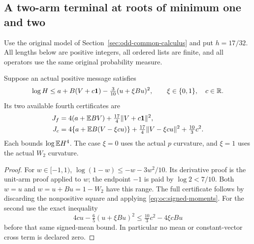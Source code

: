 \subsection{A two-arm terminal at roots of minimum one and two}
\label{sec:odd-two:roots}

Use the original model of Section~\ref{sec:odd-common-calculus} and put
\(h=17/32\). All lengths below are positive integers, all ordered lists
are finite, and all operators use the same original probability measure.

\begin{lemma}
\label{lem:odd-two:constant}
Suppose an actual positive message satisfies
\[
 \log H\le a+B(V+c\mathbf1)-\tfrac3{10}(u+\xi Bu)^2,
 \qquad \xi\in\{0,1\},\quad c\in\mathbb R.
\]
Its two available fourth certificates are
\begin{align}
 J_f&=4(a+\mathbb E BV)+\tfrac{17}{4}\|V+c\mathbf1\|^2,
       \label{eq:odd-two:full-certificate}\\
 J_c&=4\{a+\mathbb E B(V-\xi cu)\}
       +\tfrac{17}{4}\|V-\xi cu\|^2+\tfrac{10}{3}c^2.
       \label{eq:odd-two:curved-certificate}
\end{align}
Each bounds \(\log\mathbb E H^4\). The case \(\xi=0\) uses the actual
\(p\) curvature, and \(\xi=1\) uses the actual \(W_2\) curvature.
\end{lemma}
\begin{proof}
For \(w\in[-1,1)\), \(\log(1-w)\le-w-3w^2/10\).
Its derivative proof is the unit-arm proof applied to \(w\); the
endpoint \(-1\) is paid by \(\log2<7/10\). Both \(w=u\) and
\(w=u+Bu=1-W_2\) have this range. The full certificate follows by
discarding the nonpositive square and applying
\eqref{eq:oc:signed-moments}. For the second use the exact inequality
\[
 4cu-\tfrac65(u+\xi Bu)^2
 \le\tfrac{10}{3}c^2-4\xi cBu
\]
before that same signed-mean bound. In particular no mean or
constant-vector cross term is declared zero.
\end{proof}

